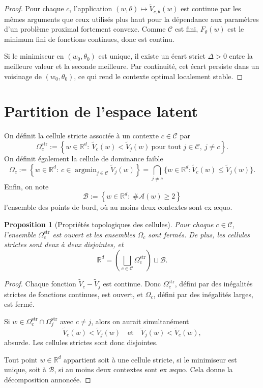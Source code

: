\documentclass[11pt,a4paper]{article}
\newtheorem{proposition}{Proposition}[section]
\DeclareMathOperator{\argmin}{argmin}
\newcommand{\R}{\mathbb R}
\newcommand{\Ccal}{\mathcal C}
\begin{document}
\begin{proof}
Pour chaque \(c\), l'application \((w,\theta)\mapsto \widetilde V_{c,\theta}(w)\) est continue par les mêmes arguments que ceux utilisés plus haut pour la dépendance aux paramètres d'un problème proximal fortement convexe.
Comme \(\Ccal\) est fini, \(F_\theta(w)\) est le minimum fini de fonctions continues, donc est continu.

Si le minimiseur en \((w_0,\theta_0)\) est unique, il existe un écart strict \(\Delta>0\) entre la meilleure valeur et la seconde meilleure. Par continuité, cet écart persiste dans un voisinage de \((w_0,\theta_0)\), ce qui rend le contexte optimal localement stable.
\end{proof}

\section{Partition de l'espace latent}

On définit la cellule stricte associée à un contexte \(c\in\Ccal\) par
\[
\Omega_c^{\mathrm{str}}
:=
\left\{
w\in\R^d:\ \widetilde V_c(w)<\widetilde V_j(w)\ \text{pour tout }j\in\Ccal,\ j\neq c
\right\}.
\]
On définit également la cellule de dominance faible
\[
\Omega_c
:=
\left\{
w\in\R^d:\ c\in\argmin_{j\in\Ccal}\widetilde V_j(w)
\right\}
=
\bigcap_{j\neq c}\{w\in\R^d:\widetilde V_c(w)\le \widetilde V_j(w)\}.
\]
Enfin, on note
\[
\mathcal B
:=
\left\{
w\in\R^d:\ \#\mathcal A(w)\ge 2
\right\}
\]
l'ensemble des points de bord, où au moins deux contextes sont ex æquo.

\begin{proposition}[Propriétés topologiques des cellules]
Pour chaque \(c\in\Ccal\), l'ensemble \(\Omega_c^{\mathrm{str}}\) est ouvert et les ensembles \(\Omega_c\) sont fermés.
De plus, les cellules strictes sont deux à deux disjointes, et
\[
\R^d
=
\left(\bigsqcup_{c\in\Ccal}\Omega_c^{\mathrm{str}}\right)\sqcup \mathcal B.
\]
\end{proposition}

\begin{proof}
Chaque fonction \(\widetilde V_c-\widetilde V_j\) est continue. Donc \(\Omega_c^{\mathrm{str}}\), défini par des inégalités strictes de fonctions continues, est ouvert, et \(\Omega_c\), défini par des inégalités larges, est fermé.

Si \(w\in\Omega_c^{\mathrm{str}}\cap\Omega_j^{\mathrm{str}}\) avec \(c\neq j\), alors on aurait simultanément
\[
\widetilde V_c(w)<\widetilde V_j(w)
\quad\text{et}\quad
\widetilde V_j(w)<\widetilde V_c(w),
\]
absurde. Les cellules strictes sont donc disjointes.

Tout point \(w\in\R^d\) appartient soit à une cellule stricte, si le minimiseur est unique, soit à \(\mathcal B\), si au moins deux contextes sont ex æquo. Cela donne la décomposition annoncée.
\end{proof}
\end{document}
